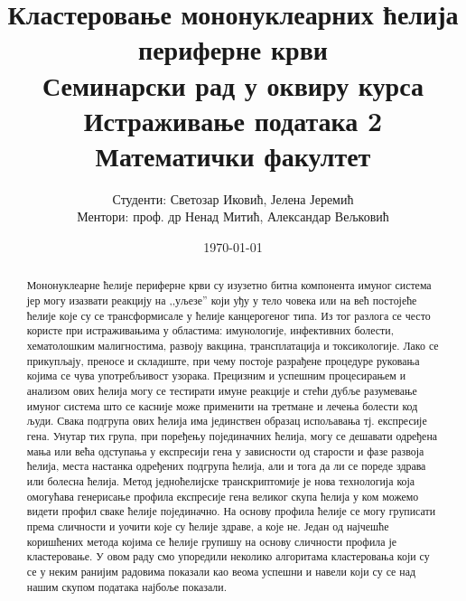 \documentclass[10pt, a4paper]{article}
\date{\specialformat\today}
\begin{document}
\newpage
\title{Кластеровање мононуклеарних ћелија периферне крви \\ \small{Семинарски рад у оквиру курса Истраживање података 2 \\ Математички факултет}}
\author{Студенти: Светозар Иковић, Јелена Јеремић \\ Ментори: проф. др Ненад Митић, Александар Вељковић}


\maketitle
\renewcommand\abstractname{Сажетак}
\renewcommand\contentsname{Садржај}
\renewcommand{\figurename}{Слика}

\begin{abstract}
Мононуклеарне ћелије периферне крви су изузетно битна компонента имуног система јер могу изазвати реакцију на ,,уљезе'' који уђу у тело човека или на већ постојеће ћелије које су се трансформисале у ћелије канцерогеног типа. Из тог разлога се често користе при истраживањима у областима: имунологије, инфективних болести, хематолошким малигностима, развоју вакцина, трансплатација и токсикологије. Лако се прикупљају, преносе и складиште, при чему постоје разрађене процедуре руковања којима се чува употребљивост узорака. Прецизним и успешним процесирањем и анализом ових ћелија могу се тестирати имуне реакције и стећи дубље разумевање имуног система што се касније може применити на третмане и лечења болести код људи. Свака подгрупа ових ћелија има јединствен образац испољавања тј. експресије гена. Унутар тих група, при поређењу појединачних ћелија, могу се дешавати одређена мања или већа одступања у експресији гена у зависности од старости и фазе развоја ћелија, места настанка одређених подгрупа ћелија, али и тога да ли се пореде здрава или болесна ћелија. Метод једноћелијске транскриптомије је нова технологија која омогућава генерисање профила експресије гена великог скупа ћелија у ком можемо видети профил сваке ћелије појединачно. На основу профила ћелије се могу груписати према сличности и уочити које су ћелије здраве, а које не. Један од најчешће коришћених метода којима се ћелије групишу на основу сличности профила је кластеровање. У овом раду смо упоредили неколико алгоритама кластеровања који су се у неким ранијим радовима показали као веома успешни и навели који су се над нашим скупом података најбоље показали.
\end{abstract}

\newpage
\tableofcontents
\newpage
\end{document}
